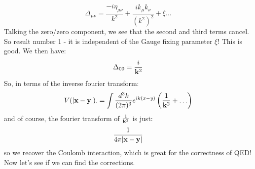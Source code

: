 \begin{equation}
    \Delta_{\mu\nu} = \frac{-i\eta_{\mu\nu}}{k^2} + \frac{ik_\mu k_\nu}{(k^2)^2} + \xi\ldots
\end{equation}
Talking the zero/zero component, we see that the second and third terms cancel. So result number 1 - it is independent of the Gauge fixing parameter $\xi$! This is good. We then have:
\begin{equation}
    \Delta_{00} = \frac{i}{\mathbf{k}^2}
\end{equation}
So, in terms of the inverse fourier transform:
\begin{equation}
    V(\lvert \mathbf{x} - \mathbf{y} \rvert) . = \int \frac{d^3k}{(2\pi)^3}e^{ik(x - y)}\left(\frac{1}{\mathbf{k}^2} + \ldots \right)
\end{equation}
and of course, the fourier transform of $\frac{1}{\mathbf{k}^2}$ is just:
\begin{equation}
    \frac{1}{4\pi\lvert \mathbf{x} - \mathbf{y} \rvert}
\end{equation}
so we recover the Coulomb interaction, which is great for the correctness of QED! Now let's see if we can find the corrections.

